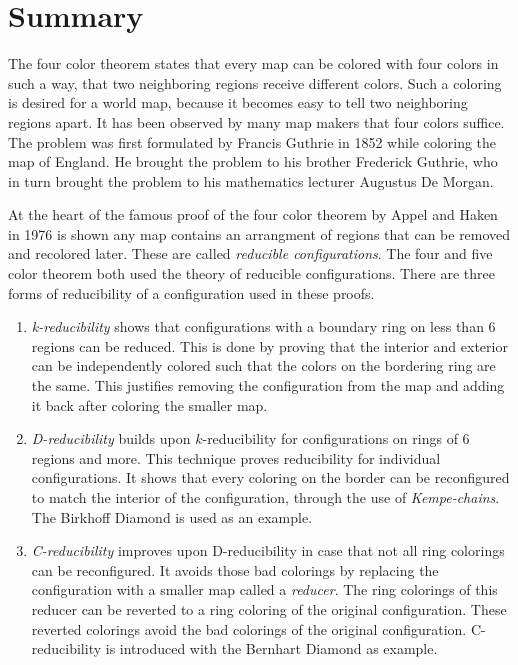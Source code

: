 \section*{Summary}
\label{sec:summary}

The four color theorem states that every map can be colored with four colors in such a way, that two neighboring regions receive different colors. Such a coloring is desired for a world map, because it becomes easy to tell two neighboring regions apart. It has been observed by many map makers that four colors suffice. The problem was first formulated by Francis Guthrie in 1852 while coloring the map of England. He brought the problem to his brother Frederick Guthrie, who in turn brought the problem to his mathematics lecturer Augustus De Morgan. 

At the heart of the famous proof of the four color theorem by Appel and Haken in 1976 \cite{appel} is shown any map contains an arrangment of regions that can be removed and recolored later. These are called \textit{reducible configurations}. The four and five color theorem both used the theory of reducible configurations. There are three forms of reducibility of a configuration used in these proofs.

\begin{enumerate}
\item \textit{k-reducibility} shows that configurations with a boundary ring on less than 6 regions can be reduced. This is done by proving that the interior and exterior can be independently colored such that the colors on the bordering ring are the same. This justifies removing the configuration from the map and adding it back after coloring the smaller map.

\item \textit{D-reducibility} builds upon $k$-reducibility for configurations on rings of 6 regions and more. This technique proves reducibility for individual configurations. It shows that every coloring on the border can be reconfigured to match the interior of the configuration, through the use of \textit{Kempe-chains}. The Birkhoff Diamond is used as an example.

\item \textit{C-reducibility} improves upon D-reducibility in case that not all ring colorings can be reconfigured. It avoids those bad colorings by replacing the configuration with a smaller map called a \textit{reducer}. The ring colorings of this reducer can be reverted to a ring coloring of the original configuration. These reverted colorings avoid the bad colorings of the original configuration. C-reducibility is introduced with the Bernhart Diamond as example.
\end{enumerate}

